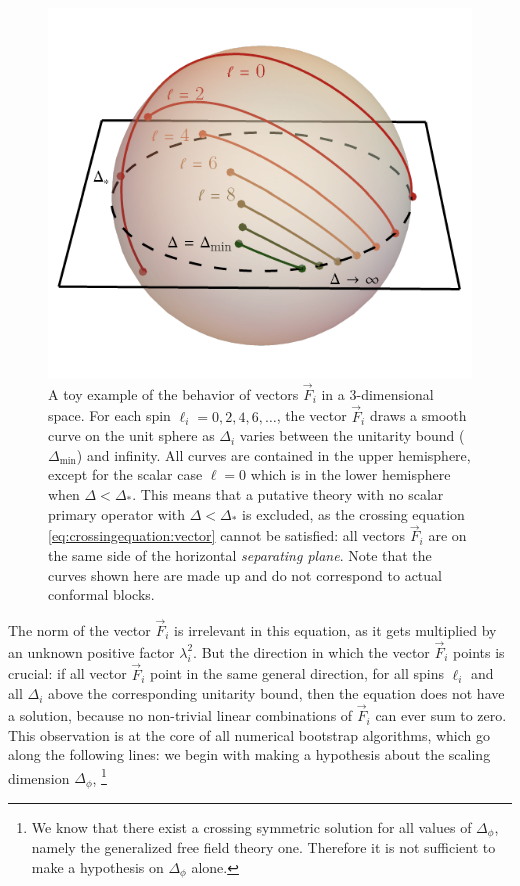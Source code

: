 \documentclass[a4paper,12pt]{article}
\numberwithin{equation}{section}
\begin{document}
\begin{figure}
	\centering
	\includegraphics[width=0.7\linewidth]{figures/separating-plane.pdf}
	\caption{A toy example of the behavior of vectors $\vec{F}_i$
	in a 3-dimensional space.
	For each spin $\ell_i = 0, 2, 4, 6, \ldots$, the vector $\vec{F}_i$
	draws a smooth curve on the unit sphere as $\Delta_i$ varies
	between the unitarity bound ($\Delta_\text{min}$) and infinity.
	All curves are contained in the upper hemisphere, except
	for the scalar case $\ell = 0$ which is in the lower hemisphere
	when $\Delta < \Delta_*$.
	This means that a putative theory with no scalar primary operator
	with $\Delta < \Delta_*$ is excluded, as the crossing equation 
	\eqref{eq:crossingequation:vector} cannot be satisfied:
	all vectors $\vec{F}_i$ are on the same side of
	the horizontal \emph{separating plane}.
	Note that the curves shown here are made up
	and do not correspond to actual conformal blocks.}
	\label{fig:separatingplane}
\end{figure}
%
The norm of the vector $\vec{F}_i$ is irrelevant in this equation, as it gets multiplied by an unknown positive factor $\lambda_i^2$. But the direction in which the vector $\vec{F}_i$ points is crucial: if all vector $\vec{F}_i$ point in the same general direction, for all spins $\ell_i$ and all $\Delta_i$ above the corresponding unitarity bound, then the equation does not have a solution, because no non-trivial linear combinations of $\vec{F}_i$ can ever sum to zero.
This observation is at the core of all numerical bootstrap algorithms, which go along the following lines:
we begin with making a hypothesis about the scaling dimension $\Delta_\phi$,%
%
\footnote{We know that there exist a crossing symmetric solution for all values of $\Delta_\phi$, namely the generalized free field theory one. Therefore it is not sufficient to make a hypothesis on $\Delta_\phi$ alone.} 
\end{document}
